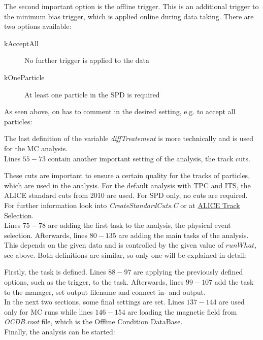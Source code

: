 \documentclass{article}
\begin{document}
The second important option is the offline trigger. This is an additional trigger to the minimum bias trigger, which is applied online during data taking. There are two options available:
\begin{description}
\item[kAcceptAll]{No further trigger is applied to the data}
\item[kOneParticle]{At least one particle in the SPD is required}
\end{description}
As seen above, on has to comment in the desired setting, e.g. to accept all particles:

The last definition of the variable \textit{diffTreatement} is more technically and is used for the MC analysis.\\
Lines $55-73$ contain another important setting of the analysis, the track cuts.

These cuts are important to ensure a certain quality for the tracks of particles, which are used in the analysis. For the default analysis with TPC and ITS, the ALICE standard cuts from 2010 are used. For SPD only, no cuts are required. For further information look into \textit{CreateStandardCuts.C} or at \href{https://twiki.cern.ch/twiki/bin/view/ALICE/SelectionOfPrimaryTracksForPpDataAnalysis}{ALICE Track Selection}.\\
Lines $75-78$ are adding the first task to the analysis, the physical event selection. Afterwards, lines $80-135$ are adding the main tasks of the analysis. This depends on the given data and is controlled by the given value of $runWhat$, see above. Both definitions are similar, so only one will be explained in detail:

Firstly, the task is defined. Lines $88-97$ are applying the previously defined options, such as the trigger, to the task. Afterwards, lines $99-107$ add the task to the manager, set output filename and connect in- and output.\\
In the next two sections, some final settings are set. Lines $137-144$ are used only for MC runs while lines $146-154$ are loading the magnetic field from \textit{OCDB.root} file, which is the Offline Condition DataBase.\\

Finally, the analysis can be started:

\end{document}
